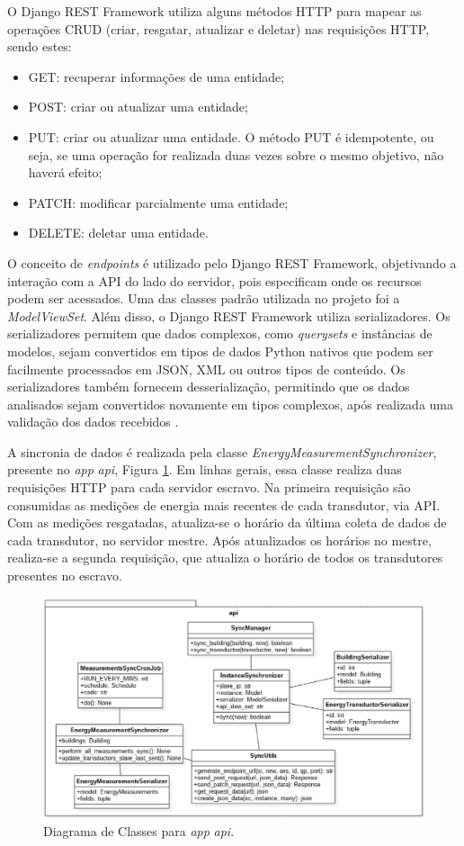 O Django REST Framework utiliza alguns métodos HTTP para mapear as operações CRUD (criar, resgatar, atualizar e deletar) nas requisições HTTP, sendo estes:

\begin{itemize}
    \item GET: recuperar informações de uma entidade;
    \item POST: criar ou atualizar uma entidade;
    \item PUT: criar ou atualizar uma entidade. O método PUT é idempotente, ou seja, se uma operação for realizada duas vezes sobre o mesmo objetivo, não haverá efeito;
    \item PATCH: modificar parcialmente uma entidade;
    \item DELETE: deletar uma entidade.
\end{itemize}

O conceito de \textit{endpoints} é utilizado pelo Django REST Framework, objetivando a interação com a API do lado do servidor, pois especificam onde os recursos podem ser acessados. Uma das classes padrão utilizada no projeto foi a \textit{ModelViewSet}. Além disso, o Django REST Framework utiliza serializadores. Os serializadores permitem que dados complexos, como \textit{querysets} e instâncias de modelos, sejam convertidos em tipos de dados Python nativos que podem ser facilmente processados em JSON, XML ou outros tipos de conteúdo. Os serializadores também fornecem desserialização, permitindo que os dados analisados sejam convertidos novamente em tipos complexos, após realizada uma validação dos dados recebidos \cite{django_rest}.

A sincronia de dados é realizada pela classe \textit{EnergyMeasurementSynchronizer}, presente no \textit{app} \textit{api}, Figura \ref{api}. Em linhas gerais, essa classe realiza duas requisições HTTP para cada servidor escravo. Na primeira requisição são consumidas as medições de energia mais recentes de cada transdutor, via API. Com as medições resgatadas, atualiza-se o horário da última coleta de dados de cada transdutor, no servidor mestre. Após atualizados os horários no mestre, realiza-se a segunda requisição, que atualiza o horário de todos os transdutores presentes no escravo.

\begin{figure}[!h]
    \centering
    \includegraphics[keepaspectratio=true,scale=0.55]{figuras/api.eps}
    \caption{Diagrama de Classes para \textit{app} \textit{api}.}
    \label{api}
\end{figure}

